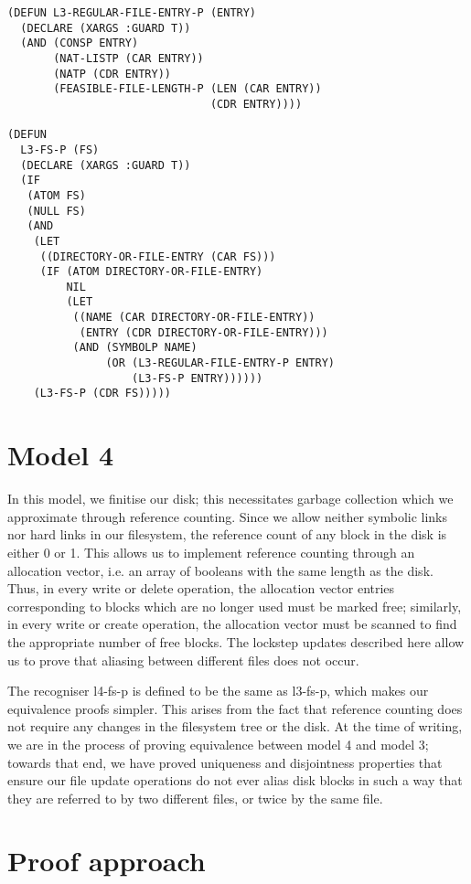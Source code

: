 \documentclass[format=sigconf,review=true]{acmart}
\begin{document}
\begin{lstlisting}
(DEFUN L3-REGULAR-FILE-ENTRY-P (ENTRY)
  (DECLARE (XARGS :GUARD T))
  (AND (CONSP ENTRY)
       (NAT-LISTP (CAR ENTRY))
       (NATP (CDR ENTRY))
       (FEASIBLE-FILE-LENGTH-P (LEN (CAR ENTRY))
                               (CDR ENTRY))))

(DEFUN
  L3-FS-P (FS)
  (DECLARE (XARGS :GUARD T))
  (IF
   (ATOM FS)
   (NULL FS)
   (AND
    (LET
     ((DIRECTORY-OR-FILE-ENTRY (CAR FS)))
     (IF (ATOM DIRECTORY-OR-FILE-ENTRY)
         NIL
         (LET
          ((NAME (CAR DIRECTORY-OR-FILE-ENTRY))
           (ENTRY (CDR DIRECTORY-OR-FILE-ENTRY)))
          (AND (SYMBOLP NAME)
               (OR (L3-REGULAR-FILE-ENTRY-P ENTRY)
                   (L3-FS-P ENTRY))))))
    (L3-FS-P (CDR FS)))))
\end{lstlisting}

\section{Model 4}
In this model, we finitise our disk; this necessitates garbage
collection which we approximate through reference
counting. Since we allow neither symbolic links nor hard links in our
filesystem, the reference count of any block in the disk is either 0
or 1. This allows us to implement reference counting through an
allocation vector, i.e. an array of booleans with the same length as
the disk. Thus, in every write or delete operation, the allocation
vector entries corresponding to blocks which are no longer used must
be marked free; similarly, in every write or create operation, the
allocation vector must be scanned to find the appropriate number of
free blocks. The lockstep updates described here allow us to prove
that aliasing between different files does not occur.

The recogniser l4-fs-p is defined to be the same as l3-fs-p, which
makes our equivalence proofs simpler. This arises from the fact that
reference counting does not require any changes in the filesystem tree
or the disk. At the time of writing, we are in the process of proving
equivalence between model 4 and model 3; towards that end, we have
proved uniqueness and disjointness properties that ensure our file
update operations do not ever alias disk blocks in such a way that
they are referred to by two different files, or twice by the same file.

\section {Proof approach}
\end{document}
